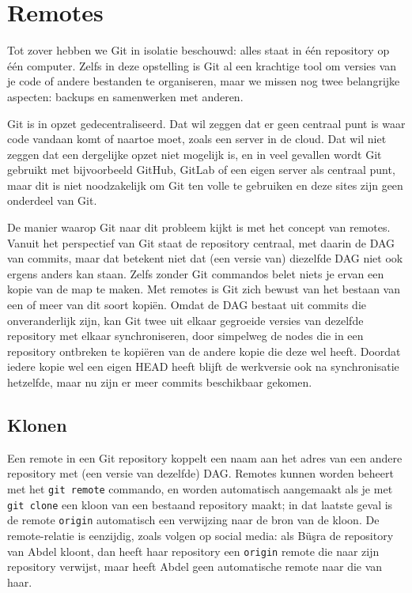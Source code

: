 \section{Remotes} \label{sec:remotes}
Tot zover hebben we Git in isolatie beschouwd: alles staat in \'e\'en repository op \'e\'en computer. Zelfs in deze opstelling is Git al een krachtige tool om versies van je code of andere bestanden te organiseren, maar we missen nog twee belangrijke aspecten: backups en samenwerken met anderen.

Git is in opzet gedecentraliseerd. Dat wil zeggen dat er geen centraal punt is waar code vandaan komt of naartoe moet, zoals een server in de cloud. Dat wil niet zeggen dat een dergelijke opzet niet mogelijk is, en in veel gevallen wordt Git gebruikt met bijvoorbeeld GitHub, GitLab of een eigen server als centraal punt, maar dit is niet noodzakelijk om Git ten volle te gebruiken en deze sites zijn geen onderdeel van Git.

De manier waarop Git naar dit probleem kijkt is met het concept van remotes. Vanuit het perspectief van Git staat de repository centraal, met daarin de DAG van commits, maar dat betekent niet dat (een versie van) diezelfde DAG niet ook ergens anders kan staan. Zelfs zonder Git commandos belet niets je ervan een kopie van de map te maken. Met remotes is Git zich bewust van het bestaan van een of meer van dit soort kopi\"en. Omdat de DAG bestaat uit commits die onveranderlijk zijn, kan Git twee uit elkaar gegroeide versies van dezelfde repository met elkaar synchroniseren, door simpelweg de nodes die in een repository ontbreken te kopi\"eren van de andere kopie die deze wel heeft. Doordat iedere kopie wel een eigen HEAD heeft blijft de werkversie ook na synchronisatie hetzelfde, maar nu zijn er meer commits beschikbaar gekomen. 

\subsection{Klonen}
Een remote in een Git repository koppelt een naam aan het adres van een andere repository met (een versie van dezelfde) DAG. Remotes kunnen worden beheert met het \texttt{git remote} commando, en worden automatisch aangemaakt als je met \texttt{git clone} een kloon van een bestaand repository maakt; in dat laatste geval is de remote \texttt{origin} automatisch een verwijzing naar de bron van de kloon. De remote-relatie is eenzijdig, zoals volgen op social media: als B\"u\c sra de repository van Abdel kloont, dan heeft haar repository een \texttt{origin} remote die naar zijn repository verwijst, maar heeft Abdel geen automatische remote naar die van haar.

